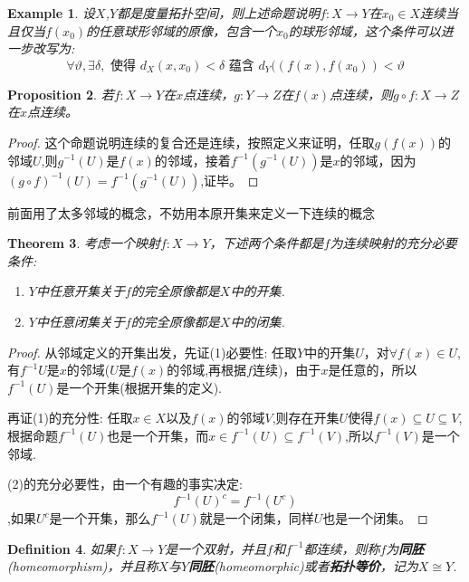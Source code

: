 \documentclass{article}
\newtheorem{theorem}{Theorem}[section]
\newtheorem{proposition}[theorem]{Proposition}
\newtheorem{example}[theorem]{Example}
\newtheorem{definition}[theorem]{Definition}
\newcommand*{\xfunc}[4]{{#2}\colon{#3}{#1}{#4}}
\newcommand*{\func}[3]{\xfunc{\to}{#1}{#2}{#3}}
\begin{document}
\begin{example}
设$X$,$Y$都是度量拓扑空间，则上述命题说明$\func{f}{X}{Y}$在$x_0 \in X$连续当且仅当$f(x_0)$的任意球形邻域的原像，包含一个$x_0$的球形邻域，这个条件可以进一步改写为:\[\forall \vartheta ,\exists \delta,\text{ 使得 } d_X(x,x_0) < \delta \text{ 蕴含 }d_Y((f(x),f(x_0)) < \vartheta\]
\end{example}

\begin{proposition}
若$\func{f}{X}{Y}$在$x$点连续，$\func{g}{Y}{Z}$在$f(x)$点连续，则$\func{g \circ f}{X}{Z}$在$x$点连续。
\end{proposition}

\begin{proof}
这个命题说明连续的复合还是连续，按照定义来证明，任取$g(f(x))$的邻域$U$,则$g^{-1}(U)$是$f(x)$的邻域，接着$f^{-1}(g^{-1}(U))$是$x$的邻域，因为$(g \circ f)^{-1}(U)=f^{-1}(g^{-1}(U))$,证毕。
\end{proof}

前面用了太多邻域的概念，不妨用本原开集来定义一下连续的概念

\begin{theorem}
考虑一个映射$\func{f}{X}{Y}$，下述两个条件都是$f$为连续映射的充分必要条件:
\begin{enumerate}
	\item $Y$中任意开集关于$f$的完全原像都是$X$中的开集.
	\item $Y$中任意闭集关于$f$的完全原像都是$X$中的闭集.
\end{enumerate}
\end{theorem}

\begin{proof}
从邻域定义的开集出发，先证(1)必要性: 任取$Y$中的开集$U$，对$\forall f(x) \in U$,有$f^{-1}{U}$是$x$的邻域($U$是$f(x)$的邻域,再根据$f$连续)，由于$x$是任意的，所以$f^{-1}(U)$是一个开集(根据开集的定义).

再证(1)的充分性: 任取$x \in X$以及$f(x)$的邻域$V$,则存在开集$U$使得$f(x) \subseteq U \subseteq V$,根据命题$f^{-1}(U)$也是一个开集，而$x \in f^{-1}(U) \subseteq f^{-1}(V)$,所以$f^{-1}(V)$是一个邻域.	

(2)的充分必要性，由一个有趣的事实决定: \[f^{-1}(U)^c  = f^{-1}(U^c)\],如果$U^c$是一个开集，那么$f^{-1}(U)$就是一个闭集，同样$U$也是一个闭集。
\end{proof}

\begin{definition}
如果$\func{f}{X}{Y}$是一个双射，并且$f$和$f^{-1}$都连续，则称$f$为\textbf{同胚}(homeomorphism)，并且称$X$与$Y$\textbf{同胚}(homeomorphic)或者\textbf{拓扑等价}，记为$X \cong Y$.
\end{definition}
\end{document}
